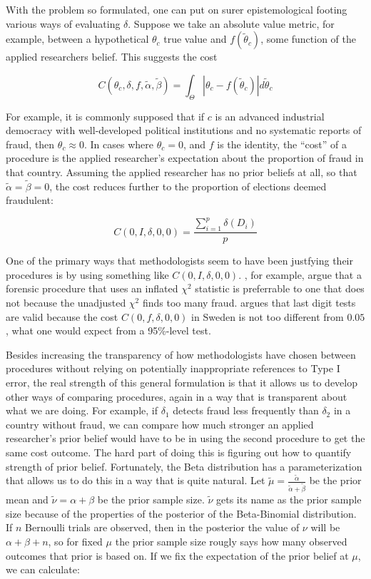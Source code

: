 With the problem so formulated, one can put on surer epistemological footing various ways of evaluating $\delta$. Suppose we take an absolute value metric, for example, between a hypothetical $\theta_c$ true value and $f(\tilde{\theta}_c)$, some function of the applied researchers belief.  This suggests the cost

\begin{equation}
C (\theta_c,\delta,f,\tilde{\alpha},\tilde{\beta}) = \int_\Theta \left| \theta_c - f(\tilde{\theta}_c) \right| d\tilde{\theta}_c \label{eq:cost}
\end{equation}

For example, it is commonly supposed that if $c$ is an advanced industrial democracy with well-developed political institutions and no systematic reports of fraud, then $\theta_c \approx 0$. In cases where $\theta_c=0$, and $f$ is the identity, the ``cost'' of a procedure is the applied researcher's expectation about the proportion of fraud in that country.  Assuming the applied researcher has no prior beliefs at all, so that $\tilde{\alpha} = \tilde{\beta} = 0$, the cost reduces further to the proportion of elections deemed fraudulent:

$$C(0,I,\delta,0,0) =\frac{\sum_{i=1}^p \delta(D_i)}{p}$$

One of the primary ways that methodologists seem to have been justfying their procedures is by using something like $C(0,I,\delta,0,0)$. \textcite{Shikano2011}, for example, argue that a forensic procedure that uses an inflated $\chi^2$ statistic is preferrable to one that does not because the unadjusted $\chi^2$ finds too many fraud. \textcite{Beber2012} argues that last digit tests are valid because the cost $C(0,f,\delta,0,0)$ in Sweden is not too different from $0.05$, what one would expect from a 95\%-level test. 

Besides increasing the transparency of how methodologists have chosen between procedures without relying on potentially inappropriate references to Type I error, the real strength of this general formulation is that it allows us to develop other ways of comparing procedures, again in a way that is transparent about what we are doing. For example, if $\delta_1$ detects fraud less frequently than $\delta_2$ in a country without fraud, we can compare how much stronger an applied researcher's prior belief would have to be in using the second procedure to get the same cost outcome. The hard part of doing this is figuring out how to quantify strength of prior belief.  Fortunately, the Beta distribution has a parameterization that allows us to do this in a way that is quite natural. Let $\tilde{\mu} = \frac{\tilde{\alpha}}{\tilde{\alpha}+\tilde{\beta}}$ be the prior mean and $\tilde{\nu} = \alpha+\beta$ be the prior sample size. $\tilde{\nu}$ gets its name as the prior sample size because of the properties of the posterior of the Beta-Binomial distribution. If $n$ Bernoulli trials are observed, then in the posterior the value of $\nu$ will be $\alpha+\beta+n$, so for fixed $\mu$ the prior sample size rougly says how many observed outcomes that prior is based on.  If we fix the expectation of the prior belief at $\mu$, we can calculate:

